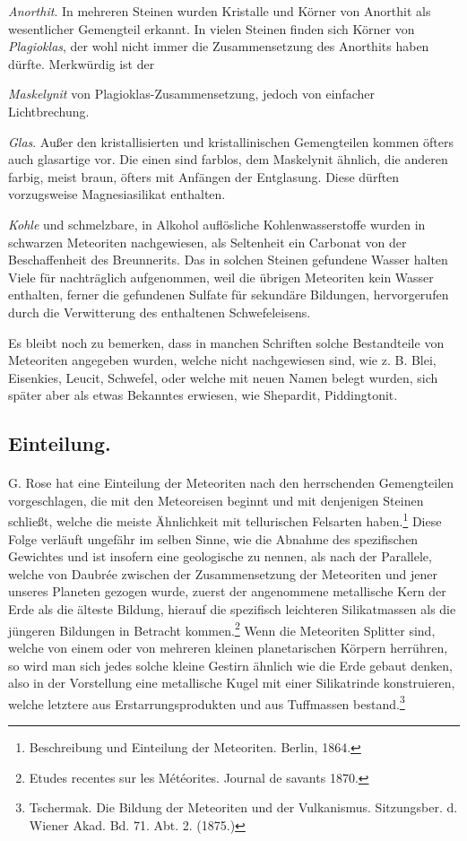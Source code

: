 \documentclass[a4paper, 11pt, oneside, polutonikogreek, german]{article}
\begin{document}
\emph{Anorthit}. In mehreren Steinen wurden Kristalle und Körner von Anorthit als wesentlicher Gemengteil erkannt. In vielen Steinen finden sich Körner von \emph{Plagioklas}, der wohl nicht immer die Zusammensetzung des Anorthits haben dürfte. Merkwürdig ist der

\emph{Maskelynit} von Plagioklas-Zusammensetzung, jedoch von einfacher Lichtbrechung.

\emph{Glas}. Außer den kristallisierten und kristallinischen Gemengteilen kommen öfters auch glasartige vor. Die einen sind farblos, dem Maskelynit ähnlich, die anderen farbig, meist braun, öfters mit Anfängen der Entglasung. Diese dürften vorzugsweise Magnesiasilikat enthalten.

\emph{Kohle} und schmelzbare, in Alkohol auflösliche Kohlenwasserstoffe wurden in schwarzen Meteoriten nachgewiesen, als Seltenheit ein Carbonat von der Beschaffenheit des Breunnerits. Das in solchen Steinen gefundene Wasser halten Viele für nachträglich aufgenommen, weil die übrigen Meteoriten kein Wasser enthalten, ferner die gefundenen Sulfate für sekundäre Bildungen, hervorgerufen durch die Verwitterung des enthaltenen Schwefeleisens.

Es bleibt noch zu bemerken, dass in manchen Schriften solche Bestandteile von Meteoriten angegeben wurden, welche nicht nachgewiesen sind, wie z. B. Blei, Eisenkies, Leucit, Schwefel, oder welche mit neuen Namen belegt wurden, sich später aber als etwas Bekanntes erwiesen, wie Shepardit, Piddingtonit.

\subsection{Einteilung.}
\paragraph*{}
G. Rose hat eine Einteilung der Meteoriten nach den herrschenden Gemengteilen vorgeschlagen, die mit den Meteoreisen beginnt und mit denjenigen Steinen schließt, welche die meiste Ähnlichkeit mit tellurischen Felsarten haben.\footnote{Beschreibung und Einteilung der Meteoriten. Berlin, 1864.} Diese Folge verläuft ungefähr im selben Sinne, wie die Abnahme des spezifischen Gewichtes und ist insofern eine geologische zu nennen, als nach der Parallele, welche von Daubrée zwischen der Zusammensetzung der Meteoriten und jener unseres Planeten gezogen wurde, zuerst der angenommene metallische Kern der Erde als die älteste Bildung, hierauf die spezifisch leichteren Silikatmassen als die jüngeren Bildungen in Betracht kommen.\footnote{Etudes recentes sur les Météorites. Journal de savants 1870.} Wenn die Meteoriten Splitter sind, welche von einem oder von mehreren kleinen planetarischen Körpern herrühren, so wird man sich jedes solche kleine Gestirn ähnlich wie die Erde gebaut denken, also in der Vorstellung eine metallische Kugel mit einer Silikatrinde konstruieren, welche letztere aus Erstarrungsprodukten und aus Tuffmassen bestand.\footnote{Tschermak. Die Bildung der Meteoriten und der Vulkanismus. Sitzungsber. d. Wiener Akad. Bd. 71. Abt. 2. (1875.)}
\end{document}
